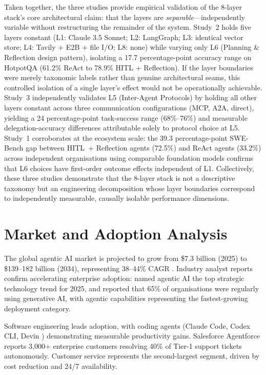 \documentclass[review]{elsarticle}
\theoremstyle{definition}
\begin{document}
Taken together, the three studies provide empirical validation of the 8-layer stack's core architectural claim: that the layers are \emph{separable}---independently variable without restructuring the remainder of the system. Study~2 holds five layers constant (L1: Claude 3.5 Sonnet; L2: LangGraph; L3: identical vector store; L4: Tavily + E2B + file I/O; L8: none) while varying only L6 (Planning \& Reflection design pattern), isolating a 17.7 percentage-point accuracy range on HotpotQA (61.2\% ReAct to 78.9\% HITL + Reflection). If the layer boundaries were merely taxonomic labels rather than genuine architectural seams, this controlled isolation of a single layer's effect would not be operationally achievable. Study~3 independently validates L5 (Inter-Agent Protocols) by holding all other layers constant across three communication configurations (MCP, A2A, direct), yielding a 24 percentage-point task-success range (68\%--76\%) and measurable delegation-accuracy differences attributable solely to protocol choice at L5. Study~1 corroborates at the ecosystem scale: the 39.3 percentage-point SWE-Bench gap between HITL~+ Reflection agents (72.5\%) and ReAct agents (33.2\%) across independent organisations using comparable foundation models confirms that L6 choices have first-order outcome effects independent of L1. Collectively, these three studies demonstrate that the 8-layer stack is not a descriptive taxonomy but an engineering decomposition whose layer boundaries correspond to independently measurable, causally isolable performance dimensions.

\section{Market and Adoption Analysis}\label{sec:market}

The global agentic AI market is projected to grow from \$7.3 billion (2025) to \$139--182 billion (2034), representing 38--44\% CAGR \citep{grandview2025agentic}. Industry analyst reports confirm accelerating enterprise adoption: \citet{gartner2025agentic} named agentic AI the top strategic technology trend for 2025, and \citet{mckinsey2024state} reported that 65\% of organisations were regularly using generative AI, with agentic capabilities representing the fastest-growing deployment category.

Software engineering leads adoption, with coding agents (Claude Code, Codex CLI, Devin \citep{cognition2024devin}) demonstrating measurable productivity gains. Salesforce Agentforce \citep{salesforce2025agentforce} reports 3,000+ enterprise customers resolving 40\% of Tier-1 support tickets autonomously. Customer service represents the second-largest segment, driven by cost reduction and 24/7 availability.
\end{document}

